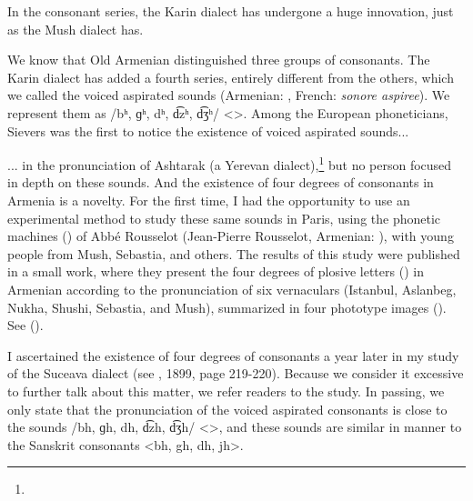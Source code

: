 
In the consonant series, the Karin dialect has undergone a huge innovation, just as the Mush dialect has. 

We know that Old Armenian distinguished three groups of consonants. The Karin dialect has added a fourth series, entirely different from the others, which we called the voiced aspirated sounds (Armenian: \textit{}, French: \textit{sonore aspiree}). We represent them as /bʰ, ɡʰ, dʰ, d͡zʰ, d͡ʒʰ/ <>. Among the European phoneticians, Sievers was the first to notice the existence of voiced aspirated sounds... 



\begin{adjarianpage}\label{page:106}\end{adjarianpage}%

... in the pronunciation of Ashtarak (a Yerevan dialect),\footnote{} but no person focused in depth on these sounds. And the existence of four degrees of consonants in Armenia is a novelty. For the first time, I had the opportunity to use an experimental method to study these same sounds in Paris, using the phonetic machines () of Abbé Rousselot (Jean-Pierre Rousselot, Armenian: ), with young people from Mush, Sebastia, and others. The results of this study were published in a small work, where they present the four degrees of plosive letters () in Armenian according to the pronunciation of six vernaculars (Istanbul, Aslanbeg, Nukha, Shushi, Sebastia, and Mush), summarized in four phototype images (). See \citet{Adjarian-1899-ArmenianExplosives} (). 

I ascertained the existence of four degrees of consonants a year later in my study of the Suceava dialect (see , 1899, page 219-220). Because we consider it excessive to further talk about this matter, we refer readers to the study. In passing, we only state that the pronunciation of the voiced aspirated consonants is close to the sounds /bh, ɡh, dh, d͡zh, d͡ʒh/ <>, and these sounds are similar in manner to the Sanskrit consonants <bh, gh, dh, jh>. 

